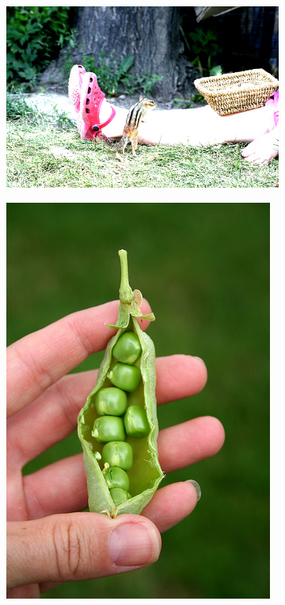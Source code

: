 \documentclass[journal, a4paper]{IEEEtran}
\begin{document}
  \begin{figure}[h]
    \begin{subfigure}{.25\textwidth}
      \centering
      \includegraphics[width=.8\linewidth]{../data/IMG_1}
      \caption{}
      \label{fig:a}
    \end{subfigure}%
    \begin{subfigure}{.25\textwidth}
      \centering
      \includegraphics[width=.8\linewidth]{../data/IMG_2}
      \caption{}
      \label{fig:b}
    \end{subfigure}


\end{figure}
\end{document}
